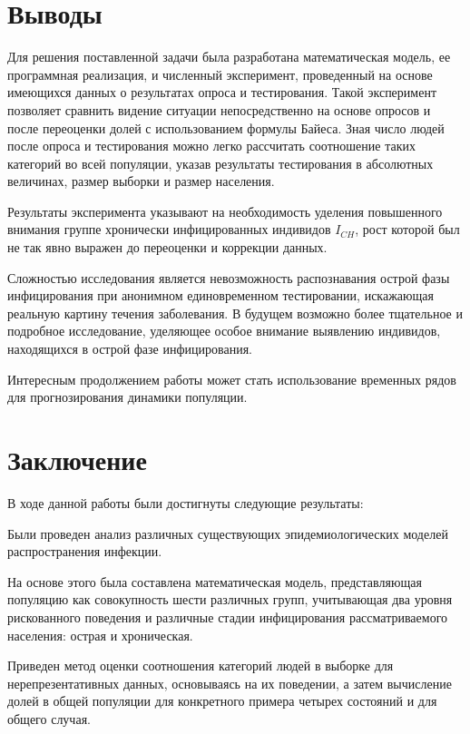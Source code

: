 \documentclass[a4paper]{report}
\begin{document}
	\chapter*{Выводы}

	Для решения поставленной задачи была разработана математическая модель, ее программная реализация, и численный эксперимент, проведенный на основе имеющихся данных о результатах опроса и тестирования. Такой эксперимент позволяет сравнить видение ситуации непосредственно на основе опросов и после переоценки долей с использованием формулы Байеса. Зная число людей после опроса и тестирования можно легко рассчитать соотношение таких категорий во всей популяции, указав результаты тестирования в абсолютных величинах, размер выборки и размер населения.
	
	Результаты эксперимента указывают на необходимость уделения повышенного внимания группе хронически инфицированных индивидов $I_{CH}$, рост которой был не так явно выражен до переоценки и коррекции данных.
	
	Сложностью исследования является невозможность распознавания острой фазы инфицирования при анонимном единовременном тестировании, искажающая реальную картину течения заболевания.	В будущем возможно более тщательное и подробное исследование, уделяющее особое внимание выявлению индивидов, находящихся в острой фазе инфицирования.
	
	Интересным продолжением работы может стать использование временных рядов для прогнозирования динамики популяции.	
		
		
	\chapter*{Заключение}


	В ходе данной работы были достигнуты следующие результаты:
	
	Были проведен анализ различных существующих эпидемиологических моделей распространения инфекции.
	
	На основе этого была составлена математическая модель, представляющая популяцию как совокупность шести различных групп, учитывающая два уровня рискованного поведения и различные стадии инфицирования рассматриваемого населения: острая и хроническая.
	
	Приведен метод оценки соотношения категорий людей в выборке для нерепрезентативных данных, основываясь на их поведении, а затем вычисление долей в общей популяции для конкретного примера четырех состояний и для общего случая.
	
\end{document}

